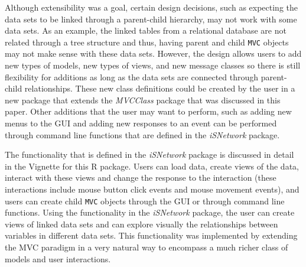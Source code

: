 \documentclass{article}[11pt]
\newcommand{\Robject}[1]{{\texttt{#1}}}
\newcommand{\Rpackage}[1]{{\textit{#1}}}
\begin{document}
Although extensibility was a goal, certain design decisions, such as expecting
the data sets to be linked through a parent-child hierarchy, may not work with
some data sets.  As an example, the linked tables from a relational database
are not related through a tree structure and thus, having parent and child
\Robject{MVC} objects may not make sense with these data sets.  However, the
design allows users to add new types of models, new types of views, and new
message classes so there is still flexibility for additions as long as the
data sets are connected through parent-child relationships.  These new class
definitions could be created by the user in a new package that extends the
\Rpackage{MVCClass} package that was discussed in this paper.  Other additions
that the user may want to perform, such as adding new menus to the GUI and
adding new responses to an event can be performed through command line
functions that are defined in the \Rpackage{iSNetwork} package.

The functionality that is defined in the \Rpackage{iSNetwork} package is
discussed in detail in the Vignette for this R package.  Users can load data,
create views of the data, interact with these views and change the response to
the interaction (these interactions include mouse button click events and
mouse movement events), and users can create child \Robject{MVC} objects
through the GUI or through command line functions.  Using the functionality in
the \Rpackage{iSNetwork} package, the user can create views of linked data sets
and can explore visually the relationships between variables in different data
sets.  This functionality was implemented by extending the MVC paradigm in a
very natural way to encompass a much richer class of models and user
interactions. 


\end{document}
